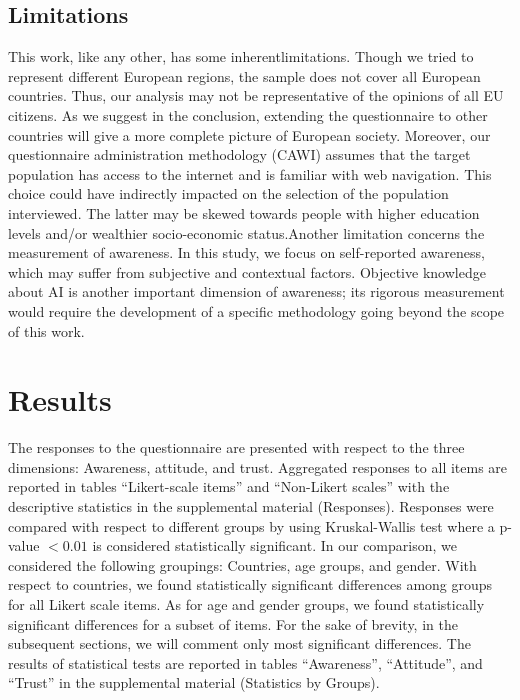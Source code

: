 \documentclass{article}
\begin{document}
\subsection{Limitations}
This work, like any other, has some inherentlimitations. Though we tried to represent different European regions, the sample does not cover all European countries. Thus, our analysis may not be representative of the opinions of all EU citizens. As we suggest in the conclusion, extending the questionnaire to other countries will give a more complete picture of European society. Moreover, our questionnaire administration methodology (CAWI) assumes that the target population has access to the internet and is familiar with web navigation. This choice could have indirectly impacted on the selection of the population interviewed. The latter may be skewed towards people with higher education levels and/or wealthier socio-economic status.Another limitation concerns the measurement of awareness. In this study, we focus on self-reported awareness, which may suffer from subjective and contextual factors. Objective knowledge about AI is another important dimension of awareness; its rigorous measurement would require the development of a specific methodology going beyond the scope of this work.

\section{Results} \label{results}

The responses to the questionnaire are presented with respect to the three dimensions: Awareness, attitude, and trust. Aggregated responses to all items are reported in tables ``Likert-scale items'' and ``Non-Likert scales'' with the descriptive statistics in the supplemental material (Responses).
Responses were compared with respect to different groups by using Kruskal-Wallis test where a p-value $< 0.01$ is considered statistically significant. In our comparison, we considered the following groupings: Countries, age groups, and gender. With respect to countries, we found statistically significant differences among groups for all Likert scale items. As for age and gender groups, we found statistically significant differences for a subset of items. For the sake of brevity, in the subsequent sections, we will comment only most significant differences. The results of statistical tests are reported in tables ``Awareness'', ``Attitude'', and ``Trust'' in the supplemental material (Statistics by Groups).
\end{document}
